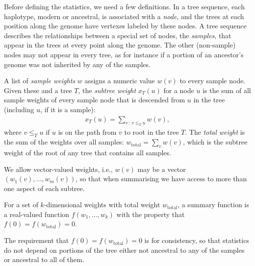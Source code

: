 \documentclass{article}
\newcommand{\iw}{w} %
\newcommand{\tiw}{w_\text{total}} %
\newcommand{\nw}{x} %
\begin{document}
Before defining the statistics, we need a few definitions.
In a tree sequence, each haplotype, modern or ancestral, is associated with a \emph{node},
and the trees at each position along the genome have vertexes labeled by these nodes.
A tree sequence describes the relationships between a special set of nodes, the \emph{samples},
that appear in the trees at every point along the genome.
The other (non-sample) nodes may not appear in every tree,
as for instance if a portion of an ancestor's genome was not inherited by any of the samples.

\begin{definition} \label{defn:weights}
    A list of \emph{sample weights} $\iw$ assigns a numeric value $\iw(v)$
    to every sample node.
    Given these and a tree $T$,
    the \emph{subtree weight} $\nw_T(u)$ for a node $u$ is the sum of all sample weights
    of every sample node that is descended from $u$ in the tree (including $u$, if it is a sample):
    \begin{align*}
        \nw_T(u) = \sum_{v \,:\, v \le_T u} \iw(v) ,
    \end{align*}
    where $v \le_T u$ if $u$ is on the path from $v$ to root in the tree $T$.
    The \emph{total weight} is the sum of the weights over all samples:
    $\tiw = \sum_v \iw(v)$, which is the subtree weight of the root of any tree
    that contains all samples.
\end{definition}

We allow vector-valued weights,
i.e., $\iw(v)$ may be a vector $(\iw_1(v), \ldots, \iw_m(v))$,
so that when summarising we have access to more than one aspect of each subtree.

\begin{definition}
    For a set of $k$-dimensional weights with total weight $\tiw$,
    a summary function is a real-valued function $f(w_1, \ldots, w_k)$
    with the property that $f(0) = f(\tiw) = 0$.
\end{definition}

The requirement that $f(0) = f(\tiw) = 0$ is for consistency,
so that statistics do not depend on portions of the tree either not ancestral to any of the samples or ancestral to all
of them.
\end{document}
